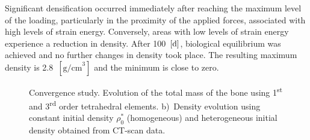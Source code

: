 \documentclass[twocolumn]{svjour3}
\begin{document}
Significant densification occurred immediately after reaching the maximum level of the loading, particularly in the proximity of the applied forces, associated with high levels of strain energy. Conversely, areas with low levels of strain energy experience a reduction in density.
After 100~$[{\text d}]$, biological equilibrium was achieved and no further changes in density took place. 
The resulting maximum density is 2.8~$[{\text {g/cm}}^3]$ and the minimum is close to zero.
\begin{figure}[h]
	\centering
	\def\svgwidth{3cm}   
\end{figure}
\begin{figure}[h]
	\captionsetup[sub]{font=small}
	\centering
	\begin{subfigure}[b]{0.475\textwidth}
		\caption{ }
		\label{fig:mc3_density}
	\end{subfigure}
	\hfill
	\begin{subfigure}[b]{0.475\textwidth}  

		\caption{  }    
		\label{fig:density_het_vs_hom}
	\end{subfigure}
	\caption{Convergence study. Evolution of the total mass of the bone using 1\textsuperscript{st} and 3\textsuperscript{rd} order tetrahedral elements. b)~Density evolution using constant initial density $\rho_0 ^\ast$ (homogeneous) and heterogeneous initial density obtained from CT-scan data.
	} 
	\label{fig:density_changes_}
\end{figure}
\end{document}
